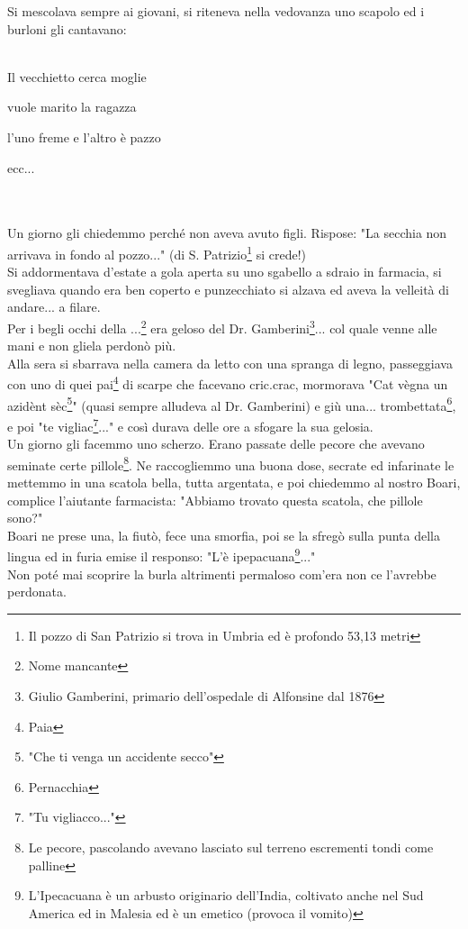 Si mescolava sempre ai giovani, si riteneva nella vedovanza uno scapolo ed i burloni gli cantavano:\\\\
\textcal \Huge
	\centerline{Il vecchietto cerca moglie}
	\centerline{vuole marito la ragazza}
	\centerline{l'uno freme e l'altro è pazzo}
	\centerline{ecc...}
\normalfont \normalsize
\\\\Un giorno gli chiedemmo perché non aveva avuto figli. Rispose: "La secchia non arrivava in fondo al pozzo..." (di S. Patrizio\footnote{Il pozzo di San Patrizio si trova in Umbria ed è profondo 53,13 metri} si crede!)\\
Si addormentava d'estate a gola aperta su uno sgabello a sdraio in farmacia, si svegliava quando era ben coperto e punzecchiato si alzava ed aveva la velleità di andare... a filare. \\
Per i begli occhi della ...\footnote{Nome mancante} era geloso del Dr. Gamberini\footnote{Giulio Gamberini, primario dell'ospedale di Alfonsine dal 1876}... col quale venne alle mani e non gliela perdonò più. \\
Alla sera si sbarrava nella camera da letto con una spranga di legno, passeggiava con uno di quei pai\footnote{Paia} di scarpe che facevano cric.crac, mormorava "Cat vègna un azidènt sèc\footnote{"Che ti venga un accidente secco"}" (quasi sempre alludeva al Dr. Gamberini) e giù una... trombettata\footnote{Pernacchia}, e poi "te vigliac\footnote{"Tu vigliacco..."}..." e così durava delle ore a sfogare la sua gelosia.\\
Un giorno gli facemmo uno scherzo. Erano passate delle pecore che avevano seminate certe pillole\footnote{Le pecore, pascolando avevano lasciato sul terreno escrementi tondi come palline}. Ne raccogliemmo una buona dose, secrate ed infarinate le mettemmo in una scatola bella, tutta argentata, e poi chiedemmo al nostro Boari, complice l'aiutante farmacista: "Abbiamo trovato questa scatola, che pillole sono?"\\
Boari ne prese una, la fiutò, fece una smorfia, poi se la sfregò sulla punta della lingua ed in furia emise il responso: "L'è ipepacuana\footnote{L'Ipecacuana è un arbusto originario dell'India, coltivato anche nel Sud America ed in Malesia ed è un emetico (provoca il vomito)}..."\\
Non poté mai scoprire la burla altrimenti permaloso com'era non ce l'avrebbe perdonata.


